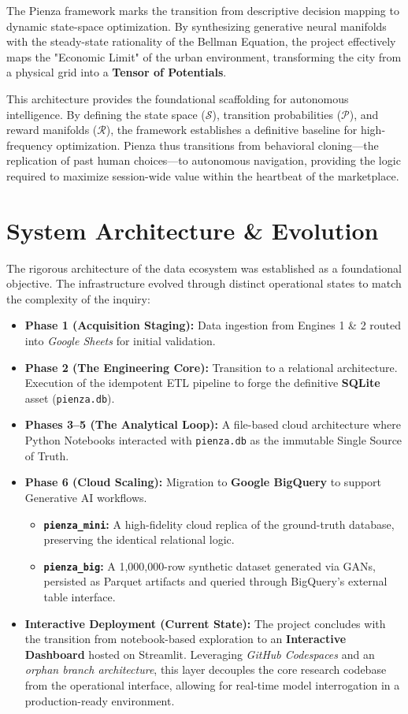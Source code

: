 \documentclass[10pt, letterpaper]{article}
\begin{document}
The Pienza framework marks the transition from descriptive decision mapping to dynamic state-space optimization. By synthesizing generative neural manifolds with the steady-state rationality of the Bellman Equation, the project effectively maps the "Economic Limit" of the urban environment, transforming the city from a physical grid into a \textbf{Tensor of Potentials}.

This architecture provides the foundational scaffolding for autonomous intelligence. By defining the state space ($\mathcal{S}$), transition probabilities ($\mathcal{P}$), and reward manifolds ($\mathcal{R}$), the framework establishes a definitive baseline for high-frequency optimization. Pienza thus transitions from behavioral cloning—the replication of past human choices—to autonomous navigation, providing the logic required to maximize session-wide value within the heartbeat of the marketplace.


\newpage
\section{System Architecture \& Evolution}
The rigorous architecture of the data ecosystem was established as a foundational objective. The infrastructure evolved through distinct operational states to match the complexity of the inquiry:

\begin{itemize}
    \item \textbf{Phase 1 (Acquisition Staging):} Data ingestion from Engines 1 \& 2 routed into \textit{Google Sheets} for initial validation.
    \item \textbf{Phase 2 (The Engineering Core):} Transition to a relational architecture. Execution of the idempotent ETL pipeline to forge the definitive \textbf{SQLite} asset (\texttt{pienza.db}).
    \item \textbf{Phases 3--5 (The Analytical Loop):} A file-based cloud architecture where Python Notebooks interacted with \texttt{pienza.db} as the immutable Single Source of Truth.
    \item \textbf{Phase 6 (Cloud Scaling):} Migration to \textbf{Google BigQuery} to support Generative AI workflows.
    \begin{itemize}
        \item \textbf{\texttt{pienza\_mini}:} A high-fidelity cloud replica of the ground-truth database, preserving the identical relational logic.
        \item \textbf{\texttt{pienza\_big}:} A 1,000,000-row synthetic dataset generated via GANs, persisted as Parquet artifacts and queried through BigQuery's external table interface.
    \end{itemize}
    \item \textbf{Interactive Deployment (Current State):} The project concludes with the transition from notebook-based exploration to an \textbf{Interactive Dashboard} hosted on Streamlit. Leveraging \textit{GitHub Codespaces} and an \textit{orphan branch architecture}, this layer decouples the core research codebase from the operational interface, allowing for real-time model interrogation in a production-ready environment.
\end{itemize}
\end{document}
